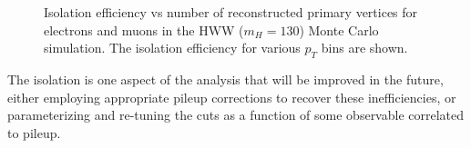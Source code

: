 \begin{figure}[!htbp]
\begin{center}
\caption{Isolation efficiency vs number of reconstructed primary vertices for electrons and muons
in the HWW ($m_{H} = 130$) Monte Carlo simulation. The isolation efficiency for various $p_{T}$ 
bins are shown.}
\label{fig:HWW130IsoEff_vs_NVertices}
\end{center}
\end{figure}


The isolation is one aspect of the analysis that will be improved in the future, either
employing appropriate pileup corrections to recover these inefficiencies, or 
parameterizing and re-tuning the cuts as a function of some observable correlated
to pileup. 


